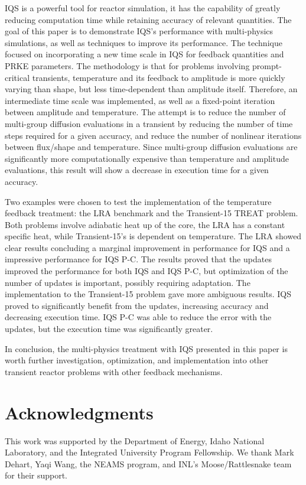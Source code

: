 \documentclass{anstrans}
\begin{document}
IQS is a powerful tool for reactor simulation, it has the capability of greatly reducing computation time while retaining accuracy of relevant quantities.  The goal of this paper is to demonstrate IQS's performance with multi-physics simulations, as well as techniques to improve its performance.  The technique focused on incorporating a new time scale in IQS for feedback quantities and PRKE parameters. The methodology is that for problems involving prompt-critical transients, temperature and its feedback to amplitude is more quickly varying than shape, but less time-dependent than amplitude itself.  Therefore, an intermediate time scale was implemented, as well as a fixed-point iteration between amplitude and temperature.  The attempt is to reduce the number of multi-group diffusion evaluations in a transient by reducing the number of time steps required for a given accuracy, and reduce the number of nonlinear iterations between flux/shape and temperature.  Since multi-group diffusion evaluations are significantly more computationally expensive than temperature and amplitude evaluations, this result will show a decrease in execution time for a given accuracy.

Two examples were chosen to test the implementation of the temperature feedback treatment: the LRA benchmark and the Transient-15 TREAT problem.  Both problems involve adiabatic heat up of the core, the LRA has a constant specific heat, while Transient-15's is dependent on temperature.  The LRA showed clear results concluding a marginal improvement in performance for IQS and a impressive performance for IQS P-C.  The results proved that the updates improved the performance for both IQS and IQS P-C, but optimization of the number of updates is important, possibly requiring adaptation.  The implementation to the Transient-15 problem gave more ambiguous results.  IQS proved to significantly benefit from the updates, increasing accuracy and decreasing execution time.  IQS P-C was able to reduce the error with the updates, but the execution time was significantly greater.

In conclusion, the multi-physics treatment with IQS presented in this paper is worth further investigation, optimization, and implementation into other transient reactor problems with other feedback mechanisms.   


\section{Acknowledgments}
This work was supported by the Department of Energy, Idaho National Laboratory, and the Integrated University Program Fellowship.  We thank Mark Dehart, Yaqi Wang, the NEAMS program, and INL's Moose/Rattlesnake team for their support.



\end{document}
